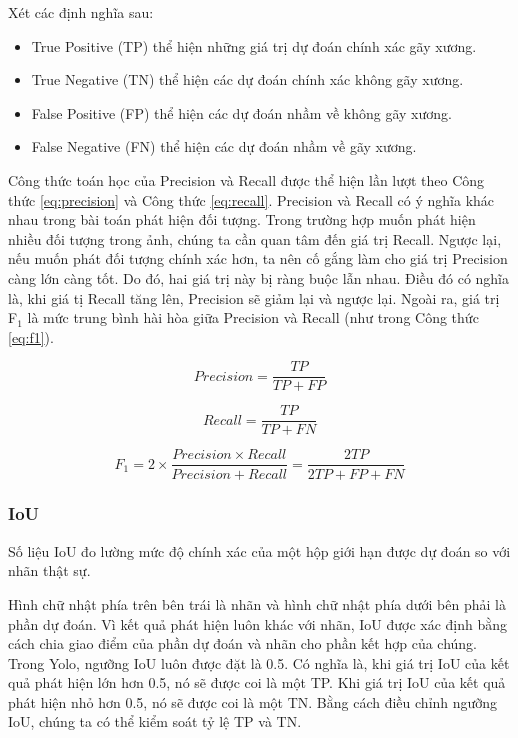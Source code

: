 \documentclass[../the.tex]{subfiles}
\begin{document}
{\fontsize{13}{12} \selectfont
	Xét các định nghĩa sau:
	\begin {itemize}
	\item True Positive (TP) thể hiện những giá trị dự đoán chính xác gãy xương.
	\item True Negative (TN) thể hiện các dự đoán chính xác không gãy xương.
	\item False Positive (FP) thể hiện các dự đoán nhầm về không gãy xương.
	\item False Negative (FN) thể hiện các dự đoán nhầm về gãy xương.
	\end {itemize}

	Công thức toán học của Precision và Recall được thể hiện lần lượt theo Công thức \ref{eq:precision} và Công thức \ref{eq:recall}. Precision và Recall có ý nghĩa khác nhau trong bài toán phát hiện đối tượng. Trong trường hợp muốn phát hiện nhiều đối tượng trong ảnh, chúng ta cần quan tâm đến giá trị Recall. Ngược lại, nếu muốn phát đối tượng chính xác hơn, ta nên cố gắng làm cho giá trị Precision càng lớn càng tốt. Do đó, hai giá trị này bị ràng buộc lẫn nhau. Điều đó có nghĩa là, khi giá tị Recall tăng lên, Precision sẽ giảm lại và ngược lại. Ngoài ra, giá trị F$_1$ là mức trung bình hài hòa giữa Precision và Recall (như trong Công thức \ref{eq:f1}).
}

\begin{equation}
	Precision = \frac{TP}{TP + FP}
	\label{eq:precision}
\end{equation}

\begin{equation}
	Recall = \frac{TP}{TP + FN}
	\label{eq:recall}
\end{equation}

\begin{equation}
	F_1 = 2 \times \frac{Precision \times Recall}{Precision + Recall} = \frac{2TP}{2TP + FP + FN}
	\label{eq:f1}
\end{equation}

\subsubsection*{IoU}

{\fontsize{13}{12} \selectfont
	Số liệu IoU đo lường mức độ chính xác của một hộp giới hạn được dự đoán so với nhãn thật sự.

	Hình chữ nhật phía trên bên trái là nhãn và hình chữ nhật phía dưới bên phải là phần dự đoán. Vì kết quả phát hiện luôn khác với nhãn, IoU được xác định bằng cách chia giao điểm của phần dự đoán và nhãn cho phần kết hợp của chúng. Trong Yolo, ngưỡng IoU luôn được đặt là 0.5. Có nghĩa là, khi giá trị IoU của kết quả phát hiện lớn hơn 0.5, nó sẽ được coi là một TP. Khi giá trị IoU của kết quả phát hiện nhỏ hơn 0.5, nó sẽ được coi là một TN. Bằng cách điều chỉnh ngưỡng IoU, chúng ta có thể kiểm soát tỷ lệ TP và TN.
}
\end{document}
